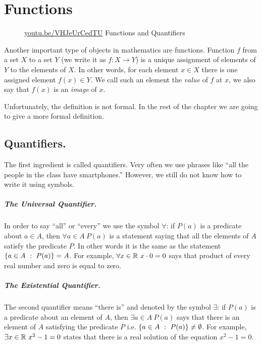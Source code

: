 \chapter{Functions}

\begin{wrapfigure}{l}{4cm}
  \begin{center}
    \vskip -0.5cm
    \vskip 0.25cm
    \href{https://youtu.be/VHJeUrCedTU}{youtu.be/VHJeUrCedTU}
    {\footnotesize Functions and Quantifiers}
  \end{center}
  \vskip -0.5cm
\end{wrapfigure}

Another important type of objects in mathematics are functions. Function $f$
from a set $X$ to a set $Y$ (we write it as $f : X \to Y$) is a unique
assignment of elements of $Y$ to the elements of $X$. In other words, for each
element $x \in X$ there is one assigned element $f(x) \in Y$. We call such an
element the \textit{value} of $f$ at $x$, we also say that $f(x)$ is an
\textit{image} of $x$.

Unfortunately, the definition is not formal. In the rest of the chapter we are
going to give a more formal definition.

\section{Quantifiers.}
The first ingredient is called quantifiers. Very often we use phrases like ``all
the people in the class have smartphones.'' However, we still do not know how to
write it using symbols.

\paragraph{The Universal Quantifier.}
In order to say ``all'' or ``every'' we use the symbol $\forall$: if
$P(a)$ is a predicate about $a \in A$, then $\forall a \in A\ P(a)$ is a
statement saying that all the elements of $A$ satisfy the predicate $P$. In
other words it is the same as the statement
$\set[P(a)]{a \in A} = A$. For example, $\forall x \in \mathbb{R}\ x \cdot 0 = 0$ says
that product of every real number and zero is equal to zero.

\paragraph{The Existential Quantifier.}
The second quantifier means ``there is'' and denoted by the symbol $\exists$:
if $P(a)$ is a predicate about an element of $A$, then $\exists a \in A\ P(a)$
says that there is an element of $A$ satisfying the predicate $P$ i.e.
$\set[P(a)]{a \in A} \neq \emptyset$. For example,
$\exists x \in \mathbb{R}\ x^2 - 1 = 0$ states that there is a real solution of the
equation $x^2 - 1 = 0$.

